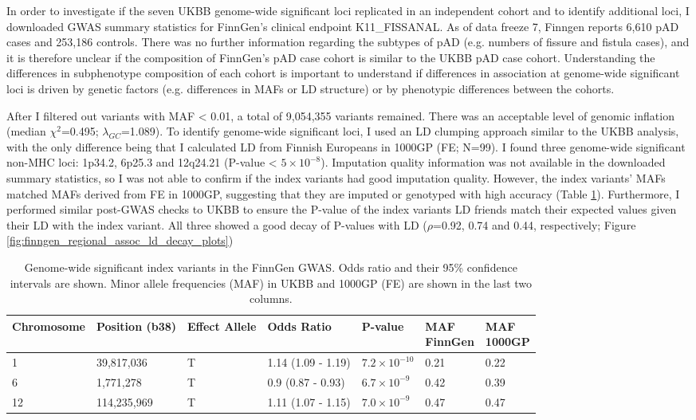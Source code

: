 In order to investigate if the seven UKBB genome-wide significant loci replicated in an independent cohort and to identify additional loci, I downloaded GWAS summary statistics for FinnGen's clinical endpoint K11\_FISSANAL. As of data freeze 7, Finngen reports 6,610 pAD cases and 253,186 controls. There was no further information regarding the subtypes of pAD (e.g. numbers of fissure and fistula cases), and it is therefore unclear if the composition of FinnGen's pAD case cohort is similar to the UKBB pAD case cohort. Understanding the differences in subphenotype composition of each cohort is important to understand if differences in association at genome-wide significant loci is driven by genetic factors (e.g. differences in MAFs or LD structure) or by phenotypic differences between the cohorts. 

After I filtered out variants with MAF < 0.01, a total of 9,054,355 variants remained. There was an acceptable level of genomic inflation (median $\chi^{2}$=0.495; $\lambda_{GC}$=1.089). To identify genome-wide significant loci, I used an LD clumping approach similar to the UKBB analysis, with the only difference being that I calculated LD from Finnish Europeans in 1000GP (FE; N=99). I found three genome-wide significant non-MHC loci: 1p34.2, 6p25.3 and 12q24.21 (P-value < $5\times10^{-8}$). Imputation quality information was not available in the downloaded summary statistics, so I was not able to confirm if the index variants had good imputation quality. However, the index variants' MAFs matched MAFs derived from FE in 1000GP, suggesting that they are imputed or genotyped with high accuracy (Table \ref{table:gws_finngen}). Furthermore, I performed similar post-GWAS checks to UKBB to ensure the P-value of the index variants LD friends match their expected values given their LD with the index variant. All three showed a good decay of P-values with LD ($\rho$=0.92, 0.74 and 0.44, respectively; Figure \ref{fig:finngen_regional_assoc_ld_decay_plots})

\begin{table}[htb]
  \centering\begingroup\fontsize{10}{12}\selectfont
  \caption{Genome-wide significant index variants in the FinnGen GWAS. Odds ratio and their 95\% confidence intervals are shown. Minor allele frequencies (MAF) in UKBB and 1000GP (FE) are shown in the last two columns.}
  \label{table:gws_finngen}
  \begin{tabular}[t]{|l|l|l|l|l|l|l|}
  \hline
  Chromosome & Position (b38) & Effect Allele & Odds Ratio & P-value & \makecell{MAF\\ FinnGen} & \makecell{MAF\\ 1000GP}\\
  \hline
  1 & 39,817,036 & T & 1.14 (1.09 - 1.19) & $7.2\times10^{-10}$ & 0.21 & 0.22\\
  \hline
  6 & 1,771,278 & T & 0.9 (0.87 - 0.93) & $6.7\times10^{-9}$ & 0.42 & 0.39\\
  \hline
  12 & 114,235,969 & T & 1.11 (1.07 - 1.15) & $7.0\times10^{-9}$ & 0.47 & 0.47\\
  \hline
  \end{tabular}
  \endgroup{}
  \end{table}

